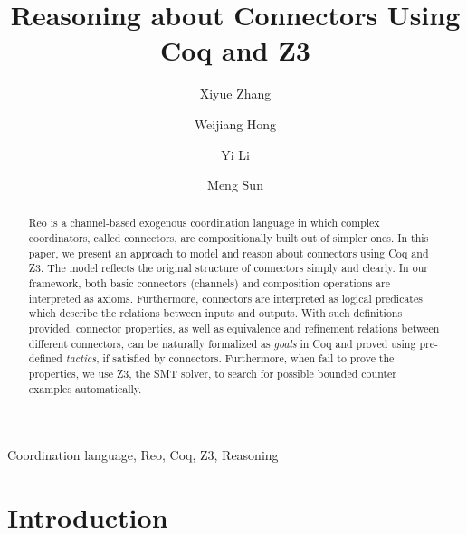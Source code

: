 \documentclass[preprint,3p]{elsarticle}
\begin{document}
\begin{frontmatter}

\title{Reasoning about Connectors Using Coq and Z3}


\author{Xiyue Zhang}
\author{Weijiang Hong}
\author{Yi Li}
\author{Meng Sun}
\address{LMAM \& DI, School of Mathematical Science, Peking University, Beijing, China}

\begin{abstract}
Reo is a channel-based exogenous coordination language in which complex coordinators, called connectors, are compositionally built out of simpler ones. In this paper, we present an approach to model and reason about connectors using Coq and Z3.
The model reflects the original structure of connectors simply and clearly. In our framework, both basic connectors (channels) and composition operations are interpreted as axioms. Furthermore, connectors are interpreted as logical predicates which describe the relations
between inputs and outputs. With such definitions provided, connector properties, as well as equivalence and refinement relations between different connectors, can be naturally formalized as \emph{goals} in Coq and proved using pre-defined \emph{tactics}, if satisfied by connectors. Furthermore, when fail to prove the properties, we use Z3, the SMT solver, to search for possible bounded counter examples automatically.

\end{abstract}
\begin{keyword}
Coordination language, Reo, Coq, Z3, Reasoning
\end{keyword}
\end{frontmatter}
\section{Introduction}\label{sec:introduction}
\end{document}
